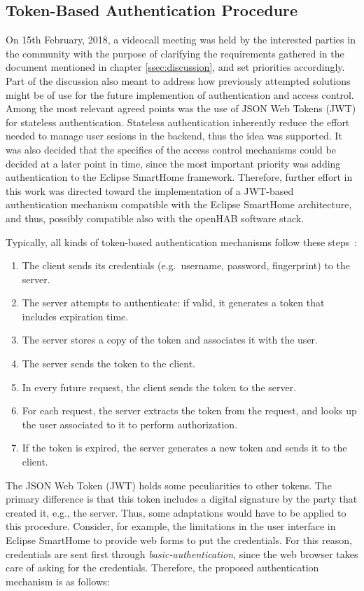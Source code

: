\documentclass[12pt]{article}
\begin{document}
\subsection{Token-Based Authentication Procedure}

On 15th February, 2018, a videocall meeting was held by the interested parties in the community with the purpose of clarifying the requirements gathered in the document mentioned in chapter \ref{ssec:discussion}, and set priorities accordingly. Part of the discussion also meant to address how previously attempted solutions might be of use for the future implemention of authentication and access control. Among the most relevant agreed points was the use of JSON Web Tokens (JWT) for stateless authentication. Stateless authentication inherently reduce the effort needed to manage user sesions in the backend, thus the idea was supported. It was also decided that the specifics of the access control mechanisms could be decided at a later point in time, since the most important priority was adding authentication to the Eclipse SmartHome framework. Therefore, further effort in this work was directed toward the implementation of a JWT-based authentication mechanism compatible with the Eclipse SmartHome architecture, and thus, possibly compatible also with the openHAB software stack.

Typically, all kinds of token-based authentication mechanisms follow these steps~\cite{token_auth}:
\begin{enumerate}
\item The client sends its credentials (e.g.\ username, password, fingerprint) to the server.
\item The server attempts to authenticate: if valid, it generates a token that includes expiration time.
\item The server stores a copy of the token and associates it with the user.
\item The server sends the token to the client.
\item In every future request, the client sends the token to the server.
\item For each request, the server extracts the token from the request, and looks up the user associated to it to perform authorization.
\item If the token is expired, the server generates a new token and sends it to the client. 
\end{enumerate}

The JSON Web Token (JWT) holds some peculiarities to other tokens. The primary difference is that this token includes a digital signature by the party that created it, e.g., the server. Thus, some adaptations would have to be applied to this procedure. Consider, for example, the limitations in the user interface in Eclipse SmartHome to provide web forms to put the credentials. For this reason, credentials are sent first through \emph{basic-authentication}, since the web browser takes care of asking for the credentials. Therefore, the proposed authentication mechanism is as follows:
\end{document}
